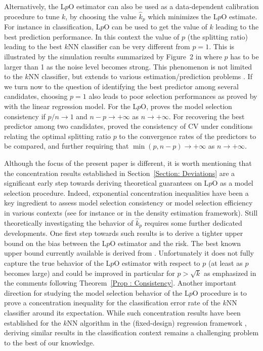 \documentclass[twoside,11pt]{article}
\numberwithin{equation}{section}
\newcommand{\1}{\mathds{1}}%
\numberwithin{equation}{section}
\theoremstyle{plain}
\begin{document}
\medskip

Alternatively, the L$p$O estimator can also be used as a data-dependent calibration procedure to tune $k$, by choosing the value $\hat{k}_p$ which minimizes the L$p$O estimate.
%
 {For instance in classification, L$p$O can be used to get the value of $k$ leading to the best prediction performance. In this context the value of $p$ (the splitting ratio) leading to the best $k$NN classifier can be very different from $p=1$. This is illustrated by the simulation results summarized by Figure~2 in \citet{CelisseMaryHuard11} where $p$ has to be larger than 1 as the noise level becomes strong. This phenomenon is not limited to the $k$NN classifier, but extends to various estimation/prediction problems \citep{Bre_Spe:1992,ArlotLerasle2012,Celi_2014}.
%
If we turn now to the question of identifying the best predictor among several candidates, choosing $p=1$ also leads to poor selection performances as proved by \citet[][Eq.~(3.8)]{Sha:1993} with the linear regression model. For the L$p$O, \citet[][Theorem~5]{Shao97} proves the model selection consistency if $p/n \to 1$ and $n-p \to +\infty$ as $n\to +\infty$.
%
For recovering the best predictor among two candidates, \citet{Yan:2006,Yang07} proved the consistency of CV under conditions relating the optimal splitting ratio $p$ to the convergence rates of the predictors to be compared, and further requiring that $\min(p,n-p) \to +\infty$ as $n\to +\infty$.
%
}

\medskip

Although the focus of the present paper is different, it is worth mentioning that the concentration results established in Section~\ref{Section: Deviations} are a significant early step towards deriving theoretical guarantees on L$p$O as a model selection procedure.
%
Indeed, exponential concentration inequalities have been a key ingredient to assess model selection consistency or model selection efficiency in various contexts (see for instance \citet{Celi_2014} or \citet{ArlotLerasle2012} in the density estimation framework).
%
Still theoretically investigating the behavior of $\hat{k}_p$ requires some further dedicated developments.
%
One first step towards such results is to derive a tighter upper bound on the bias between the L$p$O estimator and the risk.
%
The best known upper bound currently available is derived from \citet[][see Lemma~\ref{Lemma : HOresult} in the present paper]{DevroyeWagner80}. Unfortunately it does not fully capture the true behavior of the L$p$O estimator with respect to $p$ (at least as $p$ becomes large) and could be improved in particular for $p> \sqrt{k}$ as emphasized in the comments following Theorem~\ref{Prop : Consistency}.
%
Another important direction for studying the model selection behavior of the L$p$O procedure is to prove a concentration inequality for the classification error rate of the $k$NN classifier around its expectation.
%
While such concentration results have been established for the $k$NN algorithm in the (fixed-design) regression framework \citep{ArlotBach09}, deriving similar results in the classification context remains a challenging problem to the best of our knowledge.
%
\end{document}
